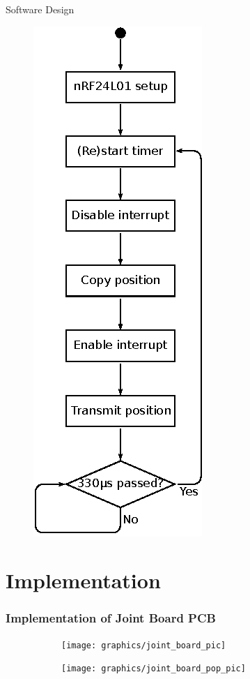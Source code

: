 \documentclass[mathserif]{beamer}
\begin{document}
\begin{frame}{Software Design}
	\begin{figure}
	\centering
	  \includegraphics[width=.25\linewidth]{graphics/joint_software_diagram}
	\end{figure}
\end{frame}




\section{Implementation}

\begin{frame}[c]\frametitle{Implementation of Joint Board PCB}
\begin{figure}
	\centering
	\begin{subfigure}{.5\textwidth}
	  \centering
	  \texttt{[image: graphics/joint\_board\_pic]}
	\end{subfigure}%
	\begin{subfigure}{.5\textwidth}
	  \centering
	  \texttt{[image: graphics/joint\_board\_pop\_pic]}
	\end{subfigure}
	\end{figure}
\end{frame}
\end{document}
